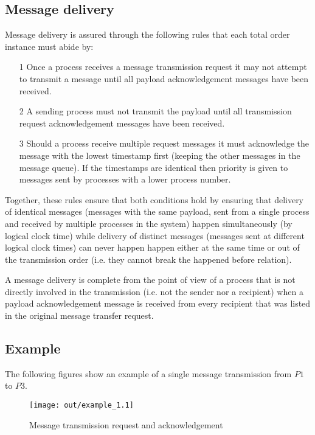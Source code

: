 \documentclass[twocolumn]{article}
\begin{document}
\subsection{Message delivery}
\label{sec:delivery}

Message delivery is assured through the following rules that each total order
instance must abide by:

\begin{enumerate}
  \item[1]
    Once a process receives a message transmission request it may not
    attempt to transmit a message until all payload acknowledgement messages have
    been received.
  \item[2]
    A sending process must not transmit the payload until all transmission
    request acknowledgement messages have been received.
  \item[3]
    Should a process receive multiple request messages it must acknowledge the
    message with the lowest timestamp first (keeping the other messages in the
    message queue).
    If the timestamps are identical then priority is given to messages sent by
    processes with a lower process number.
\end{enumerate}

Together, these rules ensure that both conditions hold by ensuring that delivery
of identical messages (messages with the same payload, sent from a single
process and received by multiple processes in the system) happen simultaneously
(by logical clock time) while delivery of distinct messages (messages sent at
different logical clock times) can never happen happen either at the same time
or out of the transmission order (i.e. they cannot break the happened before
relation).

A message delivery is complete from the point of view of a process that is not
directly involved in the transmission (i.e. not the sender nor a recipient) when
a payload acknowledgement message is received from every recipient that was
listed in the original message transfer request.

\subsection{Example}
\label{sec:example}

The following figures show an example of a single message transmission from $P1$
to $P3$.

\begin{figure}[h!]
  \centering
  \texttt{[image: out/example\_1.1]}
  \caption{Message transmission request and acknowledgement}
  \label{fig:example_1}
\end{figure}
\FloatBarrier
\end{document}
